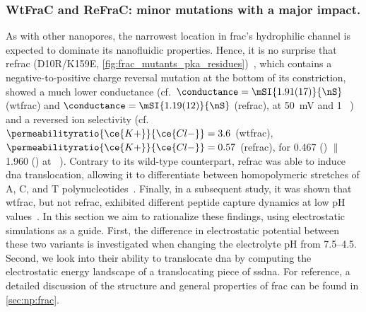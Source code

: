 \subsubsection{{WtFraC} and {ReFraC}: minor mutations with a major impact.}
%
As with other nanopores, the narrowest location in \gls{frac}'s hydrophilic channel is expected to dominate
its nanofluidic properties. Hence, it is no surprise that \gls{refrac} (D10R/K159E,
\cref{fig:frac_mutants_pka_residues})~\cite{Wloka-2016}, which contains a negative-to-positive charge reversal
mutation at the bottom of its constriction, showed a much lower conductance (cf.~$\conductance =
\mSI{1.91(17)}{\nS}$ (\gls{wtfrac}) and $\conductance = \mSI{1.19(12)}{\nS}$ (\gls{refrac}), at \SI{+50}{mV}
and \SI{1}{\Molar} ~\cite{Wloka-2016}) and a reversed ion selectivity
(cf.~$\permeabilityratio{\ce{K+}}{\ce{Cl-}} = 3.6$ (\gls{wtfrac}), $\permeabilityratio{\ce{K+}}{\ce{Cl-}} =
0.57$ (\gls{refrac}), for \SI{0.467}{\Molar}  (\cisi) $\|$ \SI{1.960}{\Molar}  (\transi) at
~\cite{Huang-2017}). Contrary to its wild-type counterpart, \gls{refrac} was able to induce \gls{dna}
translocation, allowing it to differentiate between homopolymeric stretches of A, C, and T
polynucleotides~\cite{Wloka-2016}. Finally, in a subsequent study, it was shown that \gls{wtfrac}, but not
\gls{refrac}, exhibited different peptide capture dynamics at low pH values~\cite{Huang-2017}. In this section
we aim to rationalize these findings, using electrostatic simulations as a guide. First, the difference in
electrostatic potential between these two variants is investigated when changing the electrolyte pH from
\numrange{7.5}{4.5}. Second, we look into their ability to translocate \gls{dna} by computing the
electrostatic energy landscape of a translocating piece of \gls{ssdna}. For reference, a detailed discussion
of the structure and general properties of \gls{frac} can be found in \cref{sec:np:frac}.

